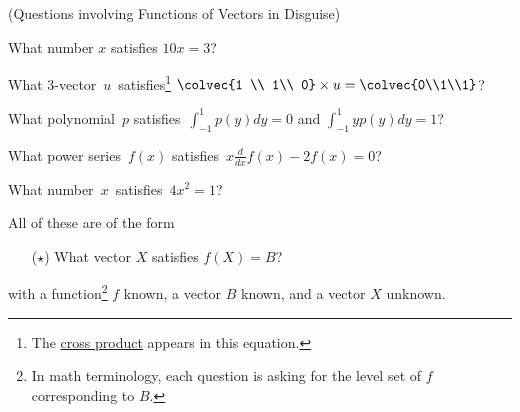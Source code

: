 \begin{example}  \label{EX}
(Questions involving Functions of Vectors in Disguise)\\
\begin{enumext}[label=\Alph*,wrap-label=(#1)]
\item\label{FVA}What number $x$ satisfies $10x=3$?
\item\label{FVB} What 3-vector~$u\!\, $  satisfies\footnote{ The \hyperlink{crossprod}{cross product} appears in this equation.}~$\!\colvec{1 \\ 1\\ 0} \times u = \colvec{0\\1\\1}$?\\[-.4cm]
\item \label{FVC}What polynomial~$p$ satisfies~$\int_{-1}^1  p(y) dy = 0$ and $\int_{-1}^1 y p(y) dy=1$?\\
\item \label{FVD}What power series~$f(x)$ satisfies~$x\frac{d}{dx} f(x) -2f(x)=0$?
\item What number~$x$~satisfies~$4 x^2=1$?
\end{enumext}
\vspace{.3cm}
All of these are of the form 
\begin{itemize}
\item[($\star$)] What vector $X$ satisfies $f(X)=B$?
\end{itemize}
with a function\footnote{In math terminology, each question is asking for the level set of $f$ corresponding to $B$.} $f$ known, a vector $B$ known, and a vector $X$ unknown.
\end{example}
